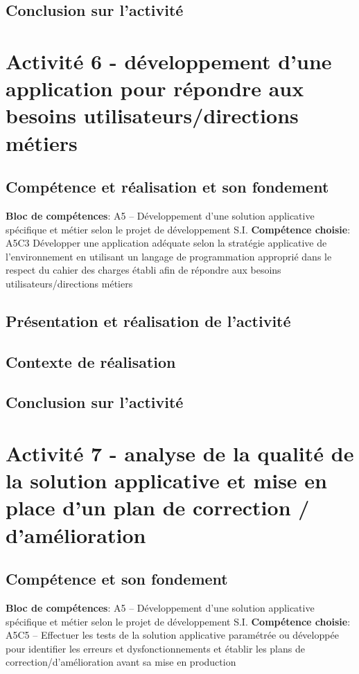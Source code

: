\documentclass[a4paper, 11pt]{report}
\begin{document}
\subsection{Conclusion sur l'activité}

\section{Activité 6 - développement d'une application pour répondre aux besoins utilisateurs/directions métiers}
\subsection{Compétence et réalisation et son fondement}
\textbf{Bloc de compétences}: A5 – Développement d’une solution applicative spécifique et métier selon le projet de développement S.I.
\newline
\textbf{Compétence choisie}: A5C3 Développer une application adéquate selon la stratégie applicative de l’environnement en utilisant un langage de programmation approprié dans le respect du cahier des charges établi afin de répondre aux besoins utilisateurs/directions métiers
\subsection{Présentation et réalisation de l'activité}
\subsection{Contexte de réalisation}
\subsection{Conclusion sur l'activité}

\section{Activité 7 - analyse de la qualité de la solution applicative et mise en place d’un plan de correction / d’amélioration}
\subsection{Compétence et son fondement}
\textbf{Bloc de compétences}: A5 – Développement d’une solution applicative spécifique et métier selon le projet de développement S.I.
\newline
\textbf{Compétence choisie}: A5C5 – Effectuer les tests de la solution applicative paramétrée ou développée pour identifier les erreurs et dysfonctionnements et établir les plans de correction/d’amélioration avant sa mise en production
\end{document}
